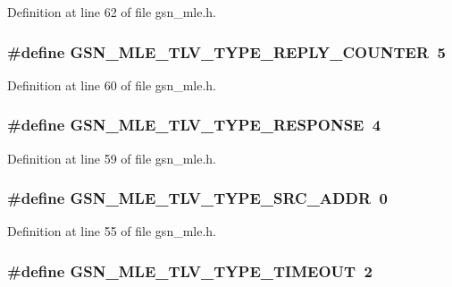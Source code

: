 Definition at line 62 of file gsn\_\-mle.h.

\hypertarget{a00527_a62e030466464f857e8ee94510302b390}{
\subsubsection[{GSN\_\-MLE\_\-TLV\_\-TYPE\_\-REPLY\_\-COUNTER}]{\setlength{\rightskip}{0pt plus 5cm}\#define GSN\_\-MLE\_\-TLV\_\-TYPE\_\-REPLY\_\-COUNTER~5}}
\label{a00527_a62e030466464f857e8ee94510302b390}


Definition at line 60 of file gsn\_\-mle.h.

\hypertarget{a00527_a1b3a4f1f292cae9ace464952b5551d93}{
\subsubsection[{GSN\_\-MLE\_\-TLV\_\-TYPE\_\-RESPONSE}]{\setlength{\rightskip}{0pt plus 5cm}\#define GSN\_\-MLE\_\-TLV\_\-TYPE\_\-RESPONSE~4}}
\label{a00527_a1b3a4f1f292cae9ace464952b5551d93}


Definition at line 59 of file gsn\_\-mle.h.

\hypertarget{a00527_a390c041d3ab533aa2a2c74903273eaaf}{
\subsubsection[{GSN\_\-MLE\_\-TLV\_\-TYPE\_\-SRC\_\-ADDR}]{\setlength{\rightskip}{0pt plus 5cm}\#define GSN\_\-MLE\_\-TLV\_\-TYPE\_\-SRC\_\-ADDR~0}}
\label{a00527_a390c041d3ab533aa2a2c74903273eaaf}


Definition at line 55 of file gsn\_\-mle.h.

\hypertarget{a00527_afdfe6e60800cfba332463eae2c77145c}{
\subsubsection[{GSN\_\-MLE\_\-TLV\_\-TYPE\_\-TIMEOUT}]{\setlength{\rightskip}{0pt plus 5cm}\#define GSN\_\-MLE\_\-TLV\_\-TYPE\_\-TIMEOUT~2}}
\label{a00527_afdfe6e60800cfba332463eae2c77145c}


